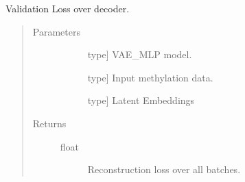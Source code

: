 \documentclass[letterpaper,10pt,english]{sphinxmanual}
\begin{document}

\begin{fulllineitems}
\label{\detokenize{index:methylnet.models.val_decoder_}}
Validation Loss over decoder.
\begin{quote}\begin{description}
\item[{Parameters}] \leavevmode\begin{description}
\item[{}] \leavevmode{[}type{]}
VAE\_MLP model.

\item[{}] \leavevmode{[}type{]}
Input methylation data.

\item[{}] \leavevmode{[}type{]}
Latent Embeddings

\end{description}

\item[{Returns}] \leavevmode\begin{description}
\item[{float}] \leavevmode
Reconstruction loss over all batches.

\end{description}

\end{description}\end{quote}

\end{fulllineitems}

\end{document}
